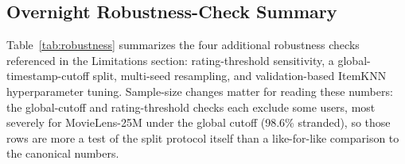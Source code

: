 \documentclass[11pt,a4paper]{article}
\begin{document}
\subsection{Overnight Robustness-Check Summary}
\label{sec:robustness}

Table~\ref{tab:robustness} summarizes the four additional robustness
checks referenced in the Limitations section: rating-threshold
sensitivity, a global-timestamp-cutoff split, multi-seed resampling,
and validation-based ItemKNN hyperparameter tuning. Sample-size changes
matter for reading these numbers: the global-cutoff and rating-threshold
checks each exclude some users, most severely for MovieLens-25M under
the global cutoff (98.6\% stranded), so those rows are more a test of
the split protocol itself than a like-for-like comparison to the
canonical numbers.
\end{document}
